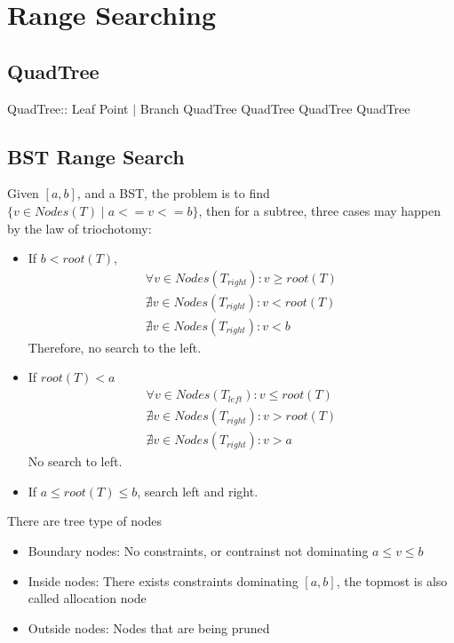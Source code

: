 \documentclass{article}
\theoremstyle{plain}
\theoremstyle{definition}
\begin{document}
\section{Range Searching}
\subsection{QuadTree}
\begin{algorithmic}
    \State QuadTree:: Leaf Point $\mid$ Branch QuadTree QuadTree QuadTree QuadTree
\end{algorithmic}

\subsection{BST Range Search}
Given $[a, b]$, and a BST, the problem is to find $\{v\in Nodes(T)\mid a <= v <= b\}$,
then for a subtree, three cases may happen by the law of triochotomy:
\begin{itemize}
    \item If $b < root(T)$,
        \begin{gather*}
            \forall v\in Nodes(T_{right}): v \geq root(T)\\
            \nexists v\in Nodes(T_{right}): v < root(T)\\
            \nexists v\in Nodes(T_{right}): v < b
        \end{gather*}
        Therefore, no search to the left.
    \item If $root(T) < a$
        \begin{gather*}
            \forall v\in Nodes(T_{left}): v \leq root(T)\\
            \nexists v\in Nodes(T_{right}): v > root(T)\\
            \nexists v\in Nodes(T_{right}): v > a
        \end{gather*}
        No search to left.
    \item If $a \leq root(T) \leq b$, search left and right.
\end{itemize}

There are tree type of nodes
\begin{itemize}
    \item Boundary nodes: No constraints, or contrainst not dominating $a \leq v \leq b$
    \item Inside nodes: There exists constraints dominating $[a,b]$,
        the topmost is also called allocation node
    \item Outside nodes: Nodes that are being pruned
\end{itemize}
\end{document}
